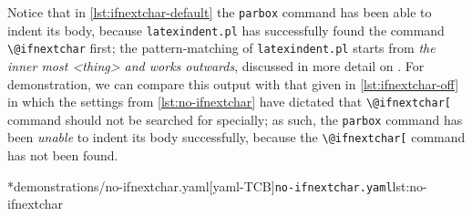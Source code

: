 	Notice that in \cref{lst:ifnextchar-default} the \texttt{parbox} command has been able to indent its body, because \texttt{latexindent.pl} has successfully found the command \lstinline!\@ifnextchar! first; the pattern-matching of \texttt{latexindent.pl} starts from \emph{the inner most <thing> and works outwards}, discussed in more detail on .
	For demonstration, we can compare this output with that given in \cref{lst:ifnextchar-off} in which the settings from \cref{lst:no-ifnextchar} have dictated that \lstinline!\@ifnextchar[! command should not be searched for specially; as such, the \texttt{parbox} command has been \emph{unable} to indent its body successfully, because the \lstinline!\@ifnextchar[! command has not been found.

	\begin{minipage}{.45\textwidth}
	\end{minipage}
	\hfill
	\begin{minipage}{.45\textwidth}
		\cmhlistingsfromfile[style=yaml-LST]*{demonstrations/no-ifnextchar.yaml}[yaml-TCB]{\texttt{no-ifnextchar.yaml}}{lst:no-ifnextchar}
	\end{minipage}
